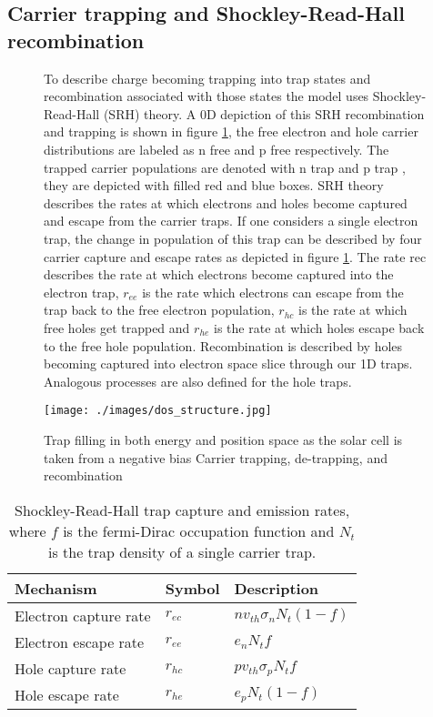 \subsection{Carrier trapping and Shockley-Read-Hall recombination}


\begin{figure}
To describe charge becoming trapping into trap states and recombination associated with those states the model uses Shockley-Read-Hall (SRH) theory. A 0D depiction of this SRH recombination and trapping is shown in figure \ref{fig:dos_structure}, the free electron and hole carrier distributions are labeled as n free and p free respectively. The trapped carrier populations are denoted with n trap and p trap , they are depicted with filled red and blue boxes. SRH theory describes the rates at which electrons and holes become captured and escape from the carrier traps. If one considers a single electron trap, the change in population of this trap can be described by four carrier capture and escape rates as depicted in figure \ref{fig:dos_structure}. The rate rec describes the rate at which electrons become captured into the electron trap, $r_{ee}$ is the rate which electrons can escape from the trap back to the free electron population, $r_{hc}$ is the rate at which free holes get trapped and $r_{he}$ is the rate at which holes escape back to the free hole population. Recombination is described by holes becoming captured into electron space slice through our 1D traps. Analogous processes are also defined for the hole traps.

\centering
\texttt{[image: ./images/dos\_structure.jpg]}
\caption{Trap filling in both energy and position space as the solar cell is taken from a negative bias
Carrier trapping, de-trapping, and recombination}
\label{fig:dos_structure}
\end{figure}


\begin{table}
\begin{center}
  \begin{tabular}{lll}
  \hline
  Mechanism & Symbol & Description  \\
  \hline
Electron capture rate & $r_{ec}$ & $n v_{th} \sigma_{n} N_{t}(1-f)$ \\
Electron escape rate & $r_{ee}$ & $e_{n} N_{t} f$ \\
Hole capture rate & $r_{hc}$ & $p v_{th} \sigma_{p} N_{t} f$ \\
Hole escape rate & $r_{he}$ & $e_{p} N_{t} (1-f)$\\
  \hline
\end{tabular}
\end{center}
\caption{Shockley-Read-Hall trap capture and emission rates, where $f$ is the fermi-Dirac occupation function and $N_{t}$ is the trap density of a single carrier trap.}
\label{tab:rates}
\end{table}


